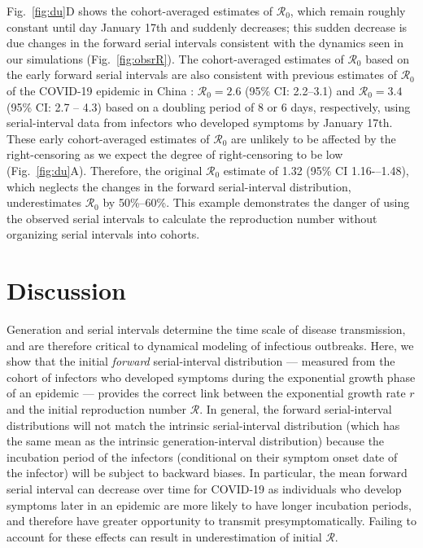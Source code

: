 \documentclass[12pt]{article}
\newcommand{\fref}[1]{Fig.~\ref{fig:#1}}
\newcommand{\Rx}[1]{\ensuremath{{\mathcal R}_{#1}}\xspace}
\newcommand{\Ro}{\Rx{0}}
\newcommand{\RR}{\ensuremath{{\mathcal R}}\xspace}
\begin{document}
\fref{du}D shows the cohort-averaged estimates of \Ro, which remain roughly constant until day January 17th and suddenly decreases;
this sudden decrease is due changes in the forward serial intervals consistent with the dynamics seen in our simulations (\fref{obsrR}).
The cohort-averaged estimates of \Ro based on the early forward serial intervals are also consistent with previous estimates of \Ro of the COVID-19 epidemic in China \citep{majumder2020early, doi:10.1098/rsif.2020.0144}:
$\Ro = 2.6$ (95\% CI: 2.2--3.1) and $\Ro = 3.4$ (95\% CI: 2.7 -- 4.3) based on a doubling period of 8 or 6 days, respectively, using serial-interval data from infectors who developed symptoms by January 17th.
These early cohort-averaged estimates of \Ro are unlikely to be affected by the right-censoring as we expect the degree of right-censoring to be low (\fref{du}A).
Therefore, the original \Ro estimate of 1.32 (95\% CI 1.16-–1.48), which neglects the changes in the forward serial-interval distribution, underestimates \Ro by 50\%--60\%.
This example demonstrates the danger of using the observed serial intervals to calculate the reproduction number without organizing serial intervals into cohorts.

\section{Discussion}

Generation and serial intervals determine the time scale of disease transmission, and are therefore critical to dynamical modeling of infectious outbreaks.
Here, we show that the initial \emph{forward} serial-interval distribution --- measured from the cohort of infectors who developed symptoms during the exponential growth phase of an epidemic --- provides the correct link between the exponential growth rate $r$ and the initial reproduction number \RR.
In general, the forward serial-interval distributions will not match the intrinsic serial-interval distribution (which has the same mean as the intrinsic generation-interval distribution) because the incubation period of the infectors (conditional on their symptom onset date of the infector) will be subject to backward biases.
In particular, the mean forward serial interval can decrease over time for COVID-19 as individuals who develop symptoms later in an epidemic are more likely to have longer incubation periods, and therefore have greater opportunity to transmit presymptomatically.
Failing to account for these effects can result in underestimation of initial \RR.
\end{document}
